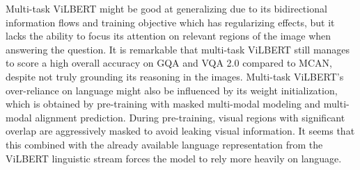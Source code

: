 \documentclass{article}
\begin{document}

Multi-task ViLBERT might be good at generalizing due to its bidirectional information flows and training objective which has regularizing effects, but it lacks the ability to focus its attention on relevant regions of the image when answering the question. It is remarkable that multi-task ViLBERT still manages to score a high overall accuracy on GQA and VQA 2.0 compared to MCAN, despite not truly grounding its reasoning in the images. Multi-task ViLBERT's over-reliance on language might also be influenced by its weight initialization, which is obtained by pre-training with masked multi-modal modeling and multi-modal alignment prediction. During pre-training, visual regions with significant overlap are aggressively masked to avoid leaking visual information. It seems that this combined with the already available language representation from the ViLBERT linguistic stream forces the model to rely more heavily on language. %


\end{document}
